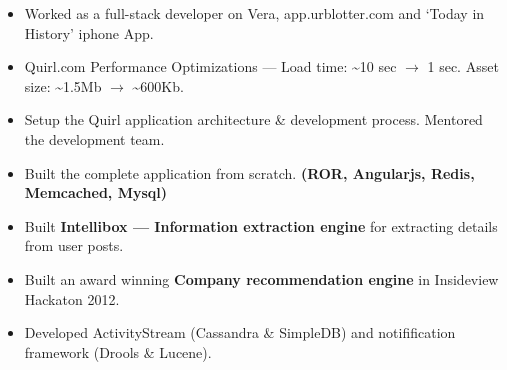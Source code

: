 \documentclass{resume}
\begin{document}
\begin{itemize} \itemsep1pt \parskip0pt
  \item Worked as a full-stack developer on Vera, app.urblotter.com and `Today in History' iphone App.
  \item Quirl.com Performance Optimizations --- Load time: \textasciitilde10 sec \( \rightarrow \) 1 sec.  
    Asset size: \textasciitilde1.5Mb \( \rightarrow \) \textasciitilde600Kb.
  \item Setup the Quirl application architecture \& development process. Mentored the development team.
\end{itemize}
\begin{itemize} \itemsep1pt \parskip0pt
  \item Built the complete application from scratch. \textbf{(ROR, Angularjs, Redis, Memcached, Mysql)}
  \item Built \textbf{Intellibox --- Information extraction engine} for extracting details from user posts.
\end{itemize}
\begin{itemize} \itemsep1pt \parskip0pt
  \item Built an award winning \textbf{Company recommendation engine} in Insideview Hackaton 2012.
  \item Developed ActivityStream (Cassandra \& SimpleDB) and notifification framework (Drools \& Lucene).
\end{itemize}
\end{document}
